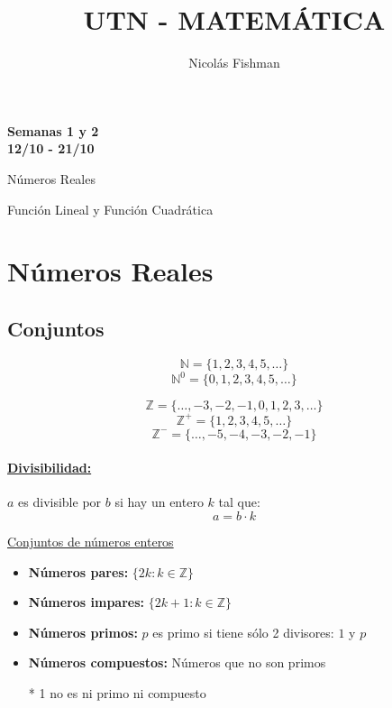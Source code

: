 \documentclass[12pt]{article}
\title{UTN - MATEMÁTICA}
\author{Nicolás Fishman}
\date{}
\begin{document}
\maketitle

\begin{center}
\textbf{\huge Semanas 1 y 2}\\
\textbf{\large 12/10 - 21/10}\\
\end{center}

\begin{itemize}
    {\item Números Reales}
     {\item Función Lineal y Función Cuadrática}
\end{itemize}

\section{Números Reales}
\subsection{Conjuntos}
$$\mathbb{N} = \{1,2,3,4,5,\dots\}$$
$$\mathbb{N}^0 = \{0,1,2,3,4,5,\dots\}$$

$$\mathbb{Z} = \{\dots,-3,-2,-1,0,1,2,3,\dots\}$$
$$\mathbb{Z}^+ = \{1,2,3,4,5,\dots\}$$
$$\mathbb{Z}^- = \{\dots,-5,-4,-3,-2,-1\}$$

\paragraph{\underline{Divisibilidad:}}
$a$ es divisible por $b$ si hay un entero $k$ tal que:
{\large$$a = b \cdot k $$}

\begin{paragraph}
    {\underline{Conjuntos de números enteros}}
    \begin{itemize}
        \item {\textbf{Números pares:} $\{2k: k \in \mathbb{Z}\}$}
        \item {\textbf{Números impares:} $\{2k +1 : k \in \mathbb{Z}\}$}
        \item {\textbf{Números primos:} $p$ es primo si tiene sólo 2    divisores: $1$ y $p$}
        \item {\textbf{Números compuestos:} Números que no son primos}
        \item[*]{1 no es ni primo ni compuesto}
    \end{itemize}
\end{paragraph}
\end{document}

